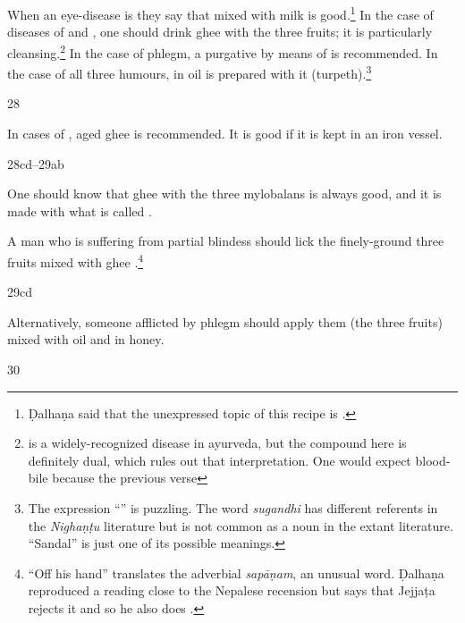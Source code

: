 \begin{translation}
    When an eye-disease is  they say that
     mixed with milk is good.\footnote{Ḍalhaṇa said
    that the unexpressed topic of this recipe is .} In
    the case of diseases of  and , one should drink
    ghee with the three fruits; it is particularly
    cleansing.\footnote{ is a
    widely-recognized disease in ayurveda, but the compound here is definitely dual,
    which rules out that interpretation. One would expect blood-bile because the
    previous verse } In the case of phlegm, a purgative by means of
     is recommended. In the case of all three humours,
     in oil is prepared with it (turpeth).\footnote{The expression 
    “” is puzzling. The word \emph{sugandhi} 
    has different referents in the \emph{Nighaṇṭu} literature but is not common as a 
    noun in the extant literature. “Sandal” is just one of its possible meanings.}
    
    \item[28]
    
    In cases of , aged ghee is recommended.  It is good if 
    it is kept in an iron vessel.
    
    \item [28cd--29ab]
    
    One should know that ghee with the three mylobalans is always good, and it is made
    with what is called .
    
    A man who is suffering from partial blindess should lick the finely-ground three fruits 
    mixed with ghee .\footnote{“Off his hand” translates the 
    adverbial \emph{sapāṇam}, an unusual word. Ḍalhaṇa reproduced a reading close 
    to the Nepalese recension but says that Jejjaṭa rejects it and so he also does 
    \citep[627]{susr-trikamji3}.}
    
    \item[29cd]
    
    Alternatively, someone afflicted by phlegm should apply them (the three fruits)
    mixed with oil and  in honey.
    
    \item[30]
    

\end{translation}
